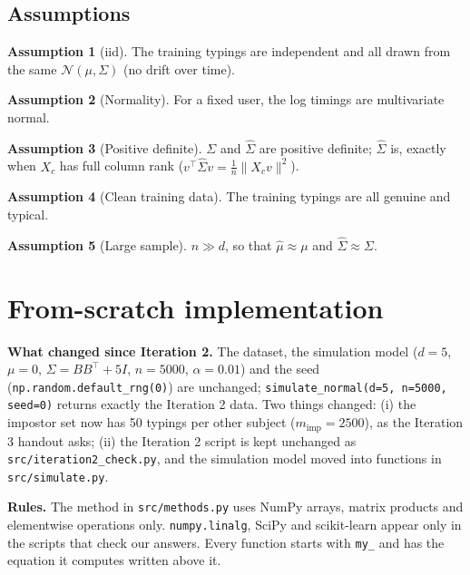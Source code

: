 \documentclass[11pt]{article}
\theoremstyle{definition}
\newtheorem{assumption}{Assumption}
\newcommand{\T}{^{\top}}
\begin{document}
\subsection{Assumptions}
\begin{assumption}[iid]\label{as:iid} The training typings are independent and all drawn from the same $\mathcal N(\mu,\Sigma)$ (no drift over time).\end{assumption}
\begin{assumption}[Normality]\label{as:normal} For a fixed user, the log timings are multivariate normal.\end{assumption}
\begin{assumption}[Positive definite]\label{as:pd} $\Sigma$ and $\hat\Sigma$ are positive definite; $\hat\Sigma$ is, exactly when $X_c$ has full column rank ($v\T\hat\Sigma v=\frac1n\|X_cv\|^2$).\end{assumption}
\begin{assumption}[Clean training data]\label{as:clean} The training typings are all genuine and typical.\end{assumption}
\begin{assumption}[Large sample]\label{as:large} $n\gg d$, so that $\hat\mu\approx\mu$ and $\hat\Sigma\approx\Sigma$.\end{assumption}

\section{From-scratch implementation}\label{sec:impl}
\textbf{What changed since Iteration 2.} The dataset, the simulation model ($d=5$, $\mu=0$, $\Sigma=BB\T+5I$, $n=5000$, $\alpha=0.01$) and the seed (\texttt{np.random.default\_rng(0)}) are unchanged; \texttt{simulate\_normal(d=5, n=5000, seed=0)} returns exactly the Iteration 2 data. Two things changed: (i) the impostor set now has 50 typings per other subject ($m_{\text{imp}}=2500$), as the Iteration 3 handout asks; (ii) the Iteration 2 script is kept unchanged as \texttt{src/iteration2\_check.py}, and the simulation model moved into functions in \texttt{src/simulate.py}.

\textbf{Rules.} The method in \texttt{src/methods.py} uses NumPy arrays, matrix products and elementwise operations only. \texttt{numpy.linalg}, SciPy and scikit-learn appear only in the scripts that check our answers. Every function starts with \texttt{my\_} and has the equation it computes written above it.
\end{document}
